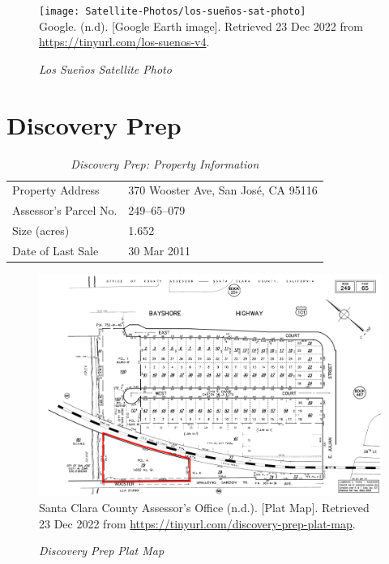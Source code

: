 \begin{figure}[hbt]
  \caption[Los Sueños Satellite Photo]{\textit{Los Sueños Satellite Photo}}\label{fig:los-sueños-sat-photo}
  \texttt{[image: Satellite-Photos/los-sueños-sat-photo]}\\ %
  \footnotesize{Google. (n.d). [Google Earth image]. Retrieved 23 Dec 2022 from \url{https://tinyurl.com/los-suenos-v4}.}
\end{figure}


\clearpage
\section{Discovery Prep}\label{sec:discover-prep-info}\indent

\begin{table}[htb]
  \SingleSpacing%
  \caption[Discovery Prep: Property Information]{\textit{Discovery Prep: Property Information}}\label{tab:discovery-prep-prop-info}
  \begin{tabular}{ll}
    \toprule
    Property Address      & 370 Wooster Ave, San José, CA 95116 \\
    Assessor's Parcel No. &  249–65–079 \\
    Size (acres)          & 1.652 \\
    Date of Last Sale     & 30 Mar 2011\\
    \bottomrule
  \end{tabular}
\end{table}

\begin{figure}[hbt]
    \caption[Discovery Prep Plat Map]{\textit{Discovery Prep Plat Map}}\label{fig:discovery-prep-plat-map}
    \includegraphics[width=\textwidth]{Assessor-Info/discovery-prep-plat-map-249-65}\\ %
    \footnotesize{Santa Clara County Assessor's Office (n.d.). [Plat Map]. Retrieved 23 Dec 2022 from  \url{https://tinyurl.com/discovery-prep-plat-map}}.
\end{figure}

